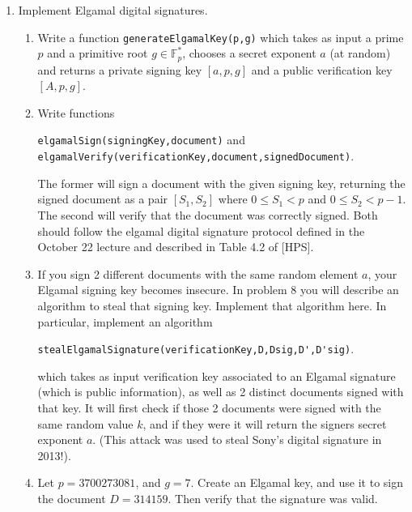 \documentclass[11pt]{article}
\newcommand{\bF}{\mathbb{F}}
\begin{document}
\begin{enumerate}
{\begin{enumerate}
{    \newpage
    $D'^{sig} =\\ \seqsplit{%
    90592809313509991477767898543561252818730285233946708276918316631997361944737647286633671059236656863128827269012547659105911490655257488384426092740746945829967538162116044915055692244129577771297348901913124079826581655154147415714324848399155672059930064485203220452985824881282662030076919344957027591627}$\\
    Which message is truthful?
    }
  \end{enumerate}
  }
  \item{
  Implement Elgamal digital signatures.
  \begin{enumerate}
    \item{
    Write a function \verb|generateElgamalKey(p,g)| which takes as input a prime $p$ and a primitive root $g\in\bF_p^*$, chooses a secret exponent $a$ (at random) and returns a private signing key $[a,p,g]$ and a public verification key $[A,p,g]$.
    }
    \item{
    Write functions \begin{center}\verb|elgamalSign(signingKey,document)| and \verb|elgamalVerify(verificationKey,document,signedDocument)|.\end{center}
    The former will sign a document with the given signing key, returning the signed document as a pair $[S_1,S_2]$ where $0\le S_1<p$ and $0\le S_2<p-1$.  The second will verify that the document was correctly signed.  Both should follow the elgamal digital signature protocol defined in the October 22 lecture and described in Table 4.2 of [HPS].
    }
    \item{
    If you sign 2 different documents with the same random element $a$, your Elgamal signing key becomes insecure.  In problem 8 you will describe an algorithm to steal that signing key.  Implement that algorithm here.  In particular, implement an algorithm
    \begin{center}
      \verb|stealElgamalSignature(verificationKey,D,Dsig,D',D'sig)|.
    \end{center}
    which takes as input verification key associated to an Elgamal signature (which is public information), as well as 2 distinct documents signed with that key.  It will first check if those 2 documents were signed with the same random value $k$, and if they were it will return the signers secret exponent $a$.  (This attack was used to steal Sony's digital signature in 2013!).
    }
    \item{
    Let $p=3700273081$, and $g=7$.  Create an Elgamal key, and use it to sign the document $D = 314159$.  Then verify that the signature was valid.
}
\end{enumerate}}
\end{enumerate}
\end{document}
